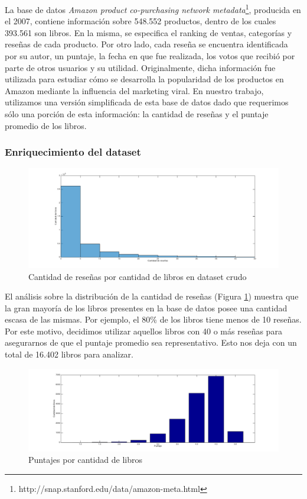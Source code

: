 \documentclass[12pt,journal,compsoc]{IEEEtran}
\begin{document}
La base de datos \textit{Amazon product co-purchasing network metadata}\footnote{http://snap.stanford.edu/data/amazon-meta.html}, producida en el 2007, contiene información sobre 548.552 productos, dentro de los cuales 393.561 son libros. En la misma, se especifica el ranking de ventas, categorías y reseñas de cada producto. Por otro lado, cada reseña se encuentra identificada por su autor, un puntaje, la fecha en que fue realizada, los votos que recibió por parte de otros usuarios y su utilidad. Originalmente, dicha información fue utilizada para estudiar cómo se desarrolla la popularidad de los productos en Amazon mediante la influencia del marketing viral\cite{leskovec}. En nuestro trabajo, utilizamos una versión simplificada de esta base de datos dado que requerimos sólo una porción de esta información: la cantidad de reseñas y el puntaje promedio de los libros.

\subsubsection{Enriquecimiento del dataset}
\begin{figure}[H]
  \centering
  \includegraphics[width=6.5in]{imgs/cantResenasVsCantLibros.png}
  \caption{\small Cantidad de reseñas por cantidad de libros en dataset crudo}
  \label{fig:cantResVsCantLibros}
\end{figure} 

El análisis sobre la distribución de la cantidad de reseñas (Figura \ref{fig:cantResVsCantLibros}) muestra que la gran mayoría de los libros presentes en la base de datos posee una cantidad escasa de las mismas. Por ejemplo, el 80\% de los libros tiene menos de 10 reseñas. Por este motivo, decidimos utilizar aquellos libros con 40 o más reseñas para asegurarnos de que el puntaje promedio sea representativo. Esto nos deja con un total de 16.402 libros para analizar.

\begin{figure}[H]
  \centering
  \includegraphics[width=6.5in]{imgs/cantidadDeLibrosVsPuntaje.png}
  \caption{\small Puntajes por cantidad de libros}
  \label{fig:cantLibrosVsPuntaje}
\end{figure} 
\end{document}
